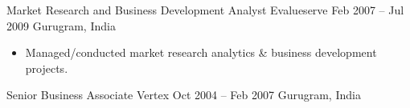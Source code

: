 \documentclass[a4paper,]{fortysecondscv}
\begin{document}
\begin{cvtable}
    \vspace{\topsep}
    \cvitemoneblock
    {Market Research and Business Development Analyst}
    {Evalueserve}
    {Feb 2007 -- Jul 2009}
    {Gurugram, India}
    {
        \begin{itemize}[nosep, leftmargin=12pt , label={-}] %
            \item Managed\//conducted market research analytics \& business development projects.
        \end{itemize}
    }
    \vspace{\topsep}
    \cvitemoneblock
    {Senior Business Associate}
    {Vertex}
    {Oct 2004 -- Feb 2007}
    {Gurugram, India}
    {
    }
\end{cvtable}





\newpage
\makebacksidebar


\end{document}
